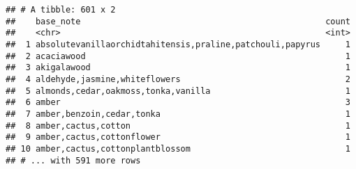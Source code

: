 \documentclass[
]{article}
\begin{document}
\begin{verbatim}
## # A tibble: 601 x 2
##    base_note                                                 count
##    <chr>                                                     <int>
##  1 absolutevanillaorchidtahitensis,praline,patchouli,papyrus     1
##  2 acaciawood                                                    1
##  3 akigalawood                                                   1
##  4 aldehyde,jasmine,whiteflowers                                 2
##  5 almonds,cedar,oakmoss,tonka,vanilla                           1
##  6 amber                                                         3
##  7 amber,benzoin,cedar,tonka                                     1
##  8 amber,cactus,cotton                                           1
##  9 amber,cactus,cottonflower                                     1
## 10 amber,cactus,cottonplantblossom                               1
## # ... with 591 more rows
\end{verbatim}
\end{document}
